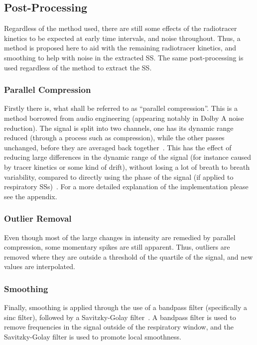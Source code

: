     \subsection{Post-Processing} \label{sec:post_processing}
        Regardless of the method used, there are still some effects of the radiotracer kinetics to be expected at early time intervals, and noise throughout. Thus, a method is proposed here to aid with the remaining radiotracer kinetics, and smoothing to help with noise in the extracted \gls{SS}. The same post-processing is used regardless of the method to extract the \gls{SS}.
            
        \subsubsection{Parallel Compression} \label{sec:parallel_compression}   
            Firstly there is, what shall be referred to as ``parallel compression''. This is a method borrowed from audio engineering (appearing notably in Dolby A noise reduction). The signal is split into two channels, one has its dynamic range reduced (through a process such as compression), while the other passes unchanged, before they are averaged back together~\parencite{Izhaki2012MixingTools}. This has the effect of reducing large differences in the dynamic range of the signal (for instance caused by tracer kinetics or some kind of drift), without losing a lot of breath to breath variability, compared to directly using the phase of the signal (if applied to respiratory \glspl{SS})~\parencite{Lamare2022PETVadis}. For a more detailed explanation of the implementation please see the appendix.

        \subsubsection{Outlier Removal} \label{sec:outlier_removal}
            Even though most of the large changes in intensity are remedied by parallel compression, some momentary spikes are still apparent. Thus, outliers are removed where they are outside a threshold of the quartile of the signal, and new values are interpolated.

        \subsubsection{Smoothing} \label{sec:smoothing}
            Finally, smoothing is applied through the use of a bandpass filter (specifically a sinc filter), followed by a Savitzky-Golay filter~\parencite{Savitzky1964SmoothingProcedures}. A bandpass filter is used to remove frequencies in the signal outside of the respiratory window, and the Savitzky-Golay filter is used to promote local smoothness.

